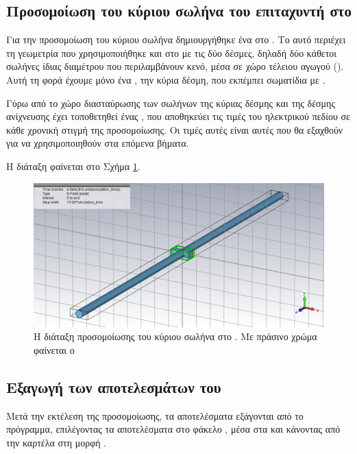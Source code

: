 \subsection{Προσομοίωση του κύριου σωλήνα του επιταχυντή στο }
Για την προσομοίωση του κύριου σωλήνα δημιουργήθηκε ένα  στο .
Το  αυτό περιέχει τη γεωμετρία που χρησιμοποιήθηκε και στο  με τις δύο δέσμες, δηλαδή δύο κάθετοι σωλήνες ίδιας διαμέτρου που περιλαμβάνουν κενό, μέσα σε χώρο τέλειου αγωγού ().
Αυτή τη φορά έχουμε μόνο ένα , την κύρια δέσμη, που εκπέμπει σωματίδια με .

Γύρω από το χώρο διασταύρωσης των σωλήνων της κύριας δέσμης και της δέσμης ανίχνευσης έχει τοποθετηθεί ένας , που αποθηκεύει τις τιμές του ηλεκτρικού πεδίου σε κάθε χρονική στιγμή της προσομοίωσης. 
Οι τιμές αυτές είναι αυτές που θα εξαχθούν για να χρησιμοποιηθούν στα επόμενα βήματα.

Η διάταξη φαίνεται στο Σχήμα \ref{fig:CST-export-main-beam-project-efield-box}.

\begin{figure}[tbh]
\includegraphics[width=\textwidth]{figures/export-main-beam-project-efield-box}
\centering
\caption[Η διάταξη προσομοίωσης του κύριου σωλήνα στο ]{Η διάταξη προσομοίωσης του κύριου σωλήνα στο . Με πράσινο χρώμα φαίνεται ο }
\label{fig:CST-export-main-beam-project-efield-box}
\end{figure}

\subsection{Εξαγωγή των αποτελεσμάτων του }
Μετά την εκτέλεση της προσομοίωσης, τα αποτελέσματα εξάγονται από το πρόγραμμα, επιλέγοντας τα αποτελέσματα στο φάκελο , μέσα στα  και κάνοντας  από την καρτέλα  στη μορφή .

